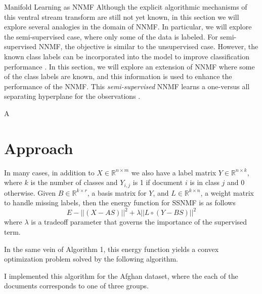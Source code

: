 \documentclass[12pt]{pom_thesis}
\begin{document}
\begin{chapter}{Manifold Learning as NNMF}
	Although the explicit algorithmic mechanisms of this ventral stream transform are still not yet known, in this section we will explore several analogies in the domain of NNMF. In particular, we will explore  the semi-supervised case, where only some of the data is labeled.  For semi-supervised NNMF, the objective is similar to the unsupervised case. However, the known class labels can be incorporated into the model to improve classification performance \cite{lee2010semi}. In this section, we will explore an extension of NNMF where some of the class labels are known, and this information is used to enhance the performance of the NNMF. This \emph{semi-supervised} NNMF  learns a one-versus all separating hyperplane for the observations \cite{lee2010semi}.
	
	A
	\section{Approach}
	In many cases, in addition to  $X \in \mathbb{R}^{n\times m}$ we also have a label matrix $Y \in \mathbb{R}^{n\times k}$, where $k$ is the number of classes and $Y_{i,j}$ is 1 if document $i$ is in class $j$ and 0 otherwise. 
	Given $B \in \mathbb{R}^{k \times r}$, a basis matrix for $Y$, and $L \in \mathbb{R}^{k \times n}$, a weight matrix to handle missing labels, then the energy function for SSNMF is as follows
	$$E - ||(X-AS)||^2 + \lambda ||L \circ (Y-BS)||^2$$
	where $\lambda$ is a tradeoff parameter that governs the importance of the supervised term.
	
	In the same vein of Algorithm 1, this energy function yields a convex optimization problem solved by the following algorithm. 
	
	\begin{algorithm}[H]
		\caption{Multiplicative Update for Semi-Supervised NNMF}
	\end{algorithm}
	I implemented this algorithm for the Afghan dataset, where the each of the documents corresponds to one of three groups. 

\end{chapter}
\end{document}
